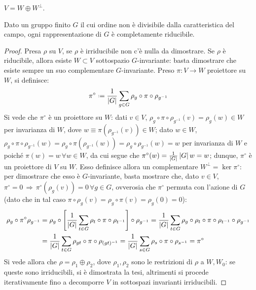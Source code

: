 \begin{propcorollary}
	$ V = W \oplus W^{\perp} $.
\end{propcorollary}

\begin{theorem}[Maschke]\label{th-maschke}
	Dato un gruppo finito $ G $ il cui ordine non è divisibile dalla caratteristica del campo, ogni rappresentazione di $ G $ è completamente riducibile.
\end{theorem}
\begin{proof}
	Presa $ \rho $ su $ V $, se $ \rho $ è irriducibile non c'è nulla da dimostrare.
	Se $ \rho $ è riducibile, allora esiste $ W \subset V $ sottospazio $ G $-invariante: basta dimostrare che esiste sempre un suo complementare $ G $-invariante.
	Preso $ \pi : V \rightarrow W $ proiettore su $ W $, si definisce:
	\begin{equation*}
		\pi^{\circ} \defeq \frac{1}{\abs{G}} \sum_{g \in G} \rho_g \circ \pi \circ \rho_{g^{-1}}
	\end{equation*}
	Si vede che $ \pi^{\circ} $ è un proiettore su $ W $: dati $ v \in V $, $ \rho_g \circ \pi \circ \rho_{g^{-1}} (v) = \rho_g (w) \in W $ per invarianza di $ W $, dove $ w \equiv \pi(\rho_{g^{-1}}(v)) \in W $; dato $ w \in W $, $ \rho_g \circ \pi \circ \rho_{g^{-1}}(w) = \rho_g \circ \pi(\rho_{g^{-1}}(w)) = \rho_g \circ \rho_{g^{-1}}(w) = w $ per invarianza di $ W $ e poiché $ \pi(w) = w \,\forall w \in W $, da cui segue che $ \pi^{\circ}(w) = \frac{1}{\left\lvert G\right\rvert} \left\lvert G\right\rvert w = w $; dunque, $ \pi^{\circ} $ è un proiettore di $ V $ su $ W $. Esso definisce allora un complementare $ W^{\perp} = \ker \pi^{\circ} $: per dimostrare che esso è $ G $-invariante, basta mostrare che, dato $ v \in V $, $ \pi^{\circ} = 0 \,\Rightarrow\, \pi^{\circ}(\rho_g(v)) = 0 \,\forall g \in G $, ovverosia che $ \pi^{\circ} $ permuta con l'azione di $ G $ (dato che in tal caso $ \pi \circ \rho_g (v) = \rho_g \circ \pi(v) = \rho_g (0) = 0 $):
	\begin{equation*}
		\begin{split}
			\rho_g \circ \pi^{\circ} \rho_{g^{-1}} 
			&= \rho_g \circ \left[ \frac{1}{\left\lvert G\right\rvert} \sum_{t \in G} \rho_t \circ \pi \circ \rho_{t^{-1}} \right] \circ \rho_{g^{-1}} = \frac{1}{\left\lvert G\right\rvert} \sum_{t \in G} \rho_g \circ \rho_t \circ \pi \circ \rho_{t^{-1}} \circ \rho_{g^{-1}}\\
			&= \frac{1}{\left\lvert G\right\rvert} \sum_{t \in G} \rho_{gt} \circ \pi \circ \rho_{(gt)^{-1}} = \frac{1}{\left\lvert G\right\rvert} \sum_{s \in G} \rho_s \circ \pi \circ \rho_{s^{-1}} = \pi^{\circ}
		\end{split}
	\end{equation*}
	Si vede allora che $ \rho = \rho_1 \oplus \rho_2 $, dove $ \rho_1,\rho_2 $ sono le restrizioni di $ \rho $ a $ W,W_0 $: se queste sono irriducibili, si è dimostrata la tesi, altrimenti si procede iterativamente fino a decomporre $ V $ in sottospazi invarianti irriducibili.
\end{proof}

